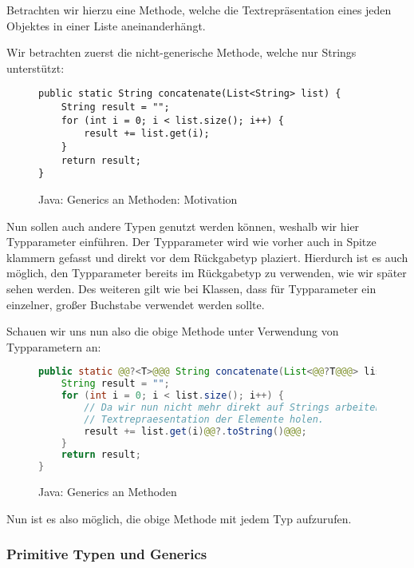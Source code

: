		Betrachten wir hierzu eine Methode, welche die Textrepräsentation eines jeden Objektes in einer Liste aneinanderhängt.
		
		Wir betrachten zuerst die nicht-generische Methode, welche nur Strings unterstützt:
		\begin{figure}[H]
			\centering
			\begin{lstlisting}
public static String concatenate(List<String> list) {
	String result = "";
	for (int i = 0; i < list.size(); i++) {
		result += list.get(i);
	}
	return result;
}
			\end{lstlisting}
			\caption{Java: Generics an Methoden: Motivation}
		\end{figure}
		
		Nun sollen auch andere Typen genutzt werden können, weshalb wir hier Typparameter einführen. Der Typparameter wird wie vorher auch in Spitze klammern gefasst und direkt vor dem Rückgabetyp plaziert. Hierdurch ist es auch möglich, den Typparameter bereits im Rückgabetyp zu verwenden, wie wir später sehen werden. Des weiteren gilt wie bei Klassen, dass für Typparameter ein einzelner, großer Buchstabe verwendet werden sollte.
		
		Schauen wir uns nun also die obige Methode unter Verwendung von Typparametern an:
		\begin{figure}[H]
			\centering
			\begin{lstlisting}[language = Java, style = base]
public static @@?<T>@@@ String concatenate(List<@@?T@@@> list) {
	String result = "";
	for (int i = 0; i < list.size(); i++) {
		// Da wir nun nicht mehr direkt auf Strings arbeiten, muessen wir uns erst die
		// Textrepraesentation der Elemente holen.
		result += list.get(i)@@?.toString()@@@;
	}
	return result;
}
			\end{lstlisting}
			\caption{Java: Generics an Methoden}
			\label{fig:generics_methoden}
		\end{figure}
		
		Nun ist es also möglich, die obige Methode mit jedem Typ aufzurufen.
	
	\subsubsection{Primitive Typen und Generics}
		\label{sec:generics_primitive_typen}
	
